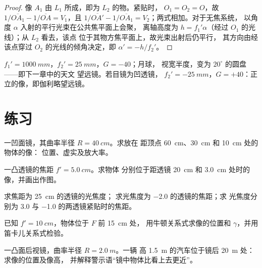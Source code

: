\begin{proof}
像 $A_1$ 由 $L_1$ 所成，即为 $L_2$ 的物。紧贴时，
$O_1 = O_2 = O$，故 $1/\overline{OA_1} - 1/\overline{OA} = V_1$，且
$1/\overline{OA'} - 1/\overline{OA_1} = V_2$；两式相加。对于无焦系统，
以角度 $\alpha$ 入射的平行光束在公共焦平面上会聚，
离轴高度为 $h = f_1'\alpha$（经过 $O_1$ 的光线）；从 $L_2$ 看去，该点
位于其物方焦平面上，故光束出射后仍平行，
其方向由经该点穿过 $O_2$ 的光线的倾角决定，即 $\alpha' = -h/f_2'$。
\end{proof}

\begin{example}[一行式望远镜]\label{ex:b1:mirrors-thin-lenses:afocal}
$f_1' = \qty{1000}{mm}$，$f_2' = \qty{25}{mm}$，$G = -40$；月球，
视宽半度，变为 $20^\circ$ 的圆盘——即下一章中的天文
望远镜。若目镜为凹透镜，
$f_2' = \qty{-25}{mm}$，$G = +40$：正立的像，即伽利略望远镜。
\end{example}

\section{练习}

\begin{exercise}[$\star$]\label{exo:b1:mirrors-thin-lenses:1}
一凹面镜，其曲率半径 $R = \qty{40}{cm}$。求放在
距顶点 \qty{60}{cm}、\qty{30}{cm} 和 \qty{10}{cm} 处的物体的像：
位置、虚实及放大率。
\end{exercise}

\begin{exercise}[$\star$]\label{exo:b1:mirrors-thin-lenses:2}
一凸透镜的焦距 $f' = \qty{5.0}{cm}$。求物体
分别位于距透镜 \qty{20}{cm} 和 \qty{3.0}{cm} 处时的像，并画出作图。
\end{exercise}

\begin{exercise}[$\star$]\label{exo:b1:mirrors-thin-lenses:3}
求焦距为 \qty{25}{cm} 的透镜的光焦度；
求光焦度为 \qty{-2.0}{\delta} 的透镜的焦距；求
光焦度分别为 \qty{+3.0}{\delta} 与 \qty{-1.0}{\delta} 的两透镜紧贴时的焦距。
\end{exercise}

\begin{exercise}[$\star$]\label{exo:b1:mirrors-thin-lenses:4}
已知 $f' = \qty{10}{cm}$，物体位于 $F$ 前 \qty{15}{cm} 处，
用牛顿关系式求像的位置和 $\gamma$，并用
笛卡儿关系式检验。
\end{exercise}

\begin{exercise}[$\star\star$]\label{exo:b1:mirrors-thin-lenses:5}
一凸面后视镜，曲率半径 $R = \qty{2.0}{m}$。一辆
高 \qty{1.5}{m} 的汽车位于镜后 \qty{20}{m} 处：求像的位置及像高，
并解释警示语“镜中物体比看上去更近”。
\end{exercise}


